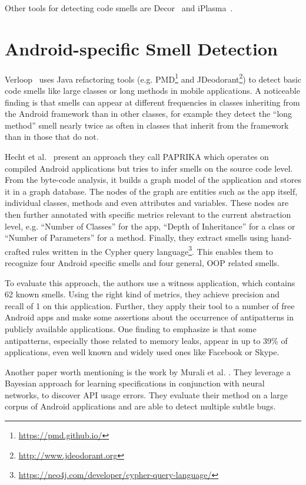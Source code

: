 Other tools for detecting code smells are Decor~\cite{moha2010decor} and iPlasma~\cite{Marinescu2005iPlasmaAI}.

\section{Android-specific Smell Detection}

Verloop~\cite{verloop2013code} uses Java refactoring tools (e.g. PMD\footnote{\url{https://pmd.github.io/}} and JDeodorant\footnote{\url{http://www.jdeodorant.org}}) to detect basic code smells like large classes or long methods in mobile applications.
A noticeable finding is that smells can appear at different frequencies in classes inheriting from the Android framework than in other classes, for example
they detect the ``long method'' smell nearly twice as often in classes that inherit from the framework than in those that do not.

Hecht et al.~\cite{hecht2015detecting} present an approach they call PAPRIKA which operates on compiled Android applications but tries to infer smells on the source code level.
From the byte-code analysis, it builds a graph model of the application and stores it in a graph database.
The nodes of the graph are entities such as the app itself, individual classes, methods and even attributes and variables.
These nodes are then further annotated with specific metrics relevant to the current abstraction level, e.g. ``Number of Classes'' for the app, ``Depth of Inheritance'' for a class or ``Number of Parameters'' for a method.
Finally, they extract smells using hand-crafted rules written in the Cypher query language\footnote{\url{https://neo4j.com/developer/cypher-query-language/}}.
This enables them to recognize four Android specific smells and four general, OOP related smells.

To evaluate this approach, the authors use a witness application, which contains 62 known smells.
Using the right kind of metrics, they achieve precision and recall of 1 on this application.
Further, they apply their tool to a number of free Android apps and make some assertions about the occurrence of antipatterns in publicly available applications.
One finding to emphasize is that some antipatterns, especially those related to memory leaks, appear in up to 39\% of applications, even well known and widely used ones like Facebook or Skype.

Another paper worth mentioning is the work by Murali et al. \cite{murali2017bayesian}.
They leverage a Bayesian approach for learning specifications in conjunction with neural networks, to discover API usage errors.
They evaluate their method on a large corpus of Android applications and are able to detect multiple subtle bugs.

